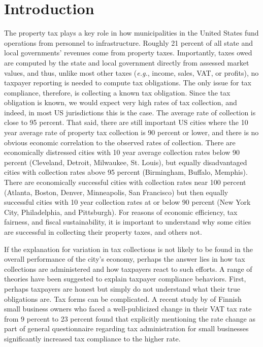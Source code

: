 \documentclass[12pt,titlepage]{article}
\begin{document}
\newpage

\section{Introduction}

The property tax plays a key role in how municipalities in the
United States fund operations from personnel to infrastructure.
Roughly 21 percent of all state and local governments’ revenues
come from property taxes.  Importantly, taxes owed are computed
by the state and local government directly from assessed market
values, and thus, unlike most other taxes (\textit{e.g.}, income, sales,
VAT, or profits), no taxpayer reporting is needed to compute tax
obligations.  The only issue for tax compliance, therefore, is
collecting a known tax obligation.  Since the tax obligation is
known, we would expect very high rates of tax collection, and
indeed, in most US jurisdictions this is the case.  The average
rate of collection is close to 95 percent.  That said, there are
still important US cities where the 10 year average rate of property
tax collection is 90 percent or lower, and there is no obvious
economic correlation to the observed rates of collection.  There
are economically distressed cities with 10 year average collection
rates below 90 percent (Cleveland, Detroit, Milwaukee, St. Louis),
but equally disadvantaged cities with collection rates above 95
percent (Birmingham, Buffalo, Memphis).   There are economically
successful cities with collection rates near 100 percent (Atlanta,
Boston, Denver, Minneapolis,  San Francisco) but then equally
successful cities with 10 year collection rates at or below 90
percent (New York City, Philadelphia, and Pittsburgh). For
reasons of economic efficiency, tax fairness, and fiscal
sustainability, it is important to understand why some cities are
successful in collecting their property taxes, and others not.  

If the explanation for variation in tax collections is not likely
to be found in the overall performance of the city's economy,
perhaps the answer lies in how tax collections are administered
and how taxpayers react to such efforts. A range of theories
have been suggested to explain taxpayer compliance behaviors. 
First, perhaps taxpayers are honest but simply do not understand
what their true obligations are. Tax forms can be complicated. 
A recent study by \citet{kosonen} of Finnish small
business owners who faced a well-publicized change in their VAT
tax rate from 9 percent to 23 percent found that explicitly
mentioning the rate change as part of general questionnaire
regarding tax administration for small businesses significantly
increased tax compliance to the higher rate. 
\end{document}
